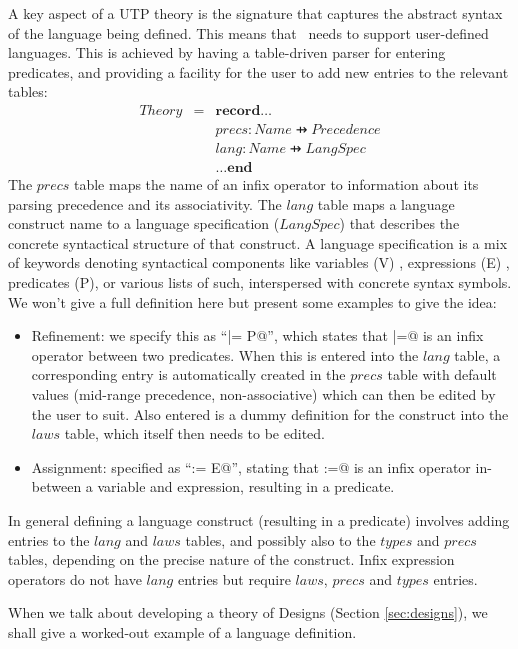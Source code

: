 A key aspect of a UTP theory is the signature that captures the
abstract syntax of the language being defined.
This means that \ needs to support user-defined languages.
This is achieved by having a table-driven parser for entering predicates,
and providing a facility for the user to add new entries
to the relevant tables:
\begin{eqnarray*}
Theory &=& \textbf{record} \ldots
\\ && precs : Name \pfun Precedence
\\ && lang : Name \pfun LangSpec
\\ && \ldots \textbf{end}
\end{eqnarray*}
The $precs$ table maps the name of an infix operator
to information about its parsing precedence and its associativity.
The $lang$ table maps a language construct name to a language specification
($LangSpec$) that describes the concrete syntactical structure of that construct.
A language specification is a mix of keywords denoting syntactical components
like variables (V) , expressions (E) , predicates (P),
 or various lists of such,
interspersed with concrete syntax symbols.
We won't give a full definition here but present some examples to give the
idea:
\begin{itemize}
  \item
    Refinement: we specify this as ``\verb@P |= P@'',
  which states that \verb@|=@ is an infix operator between two predicates.
  When this is entered into the $lang$ table,
  a corresponding entry is automatically created in the $precs$
  table with default values (mid-range precedence, non-associative)
  which can then be edited by the user to suit.
  Also entered is a dummy definition for the construct
  into the $laws$ table, which itself then needs to be edited.
  \item Assignment:
    specified as ``\verb@V := E@'', stating that \verb@:=@
    is an infix operator in-between a variable and expression,
    resulting in a predicate.
\end{itemize}
In general defining a language construct (resulting in a predicate)
 involves adding entries
to the $lang$ and $laws$ tables,
and possibly also to the $types$ and $precs$ tables, depending
on the precise nature of the construct.
Infix expression operators do not have $lang$ entries
but require $laws$, $precs$ and $types$ entries.

When we talk about developing a theory of Designs (Section \ref{sec:designs}),
we shall give a worked-out example of  a language definition.

